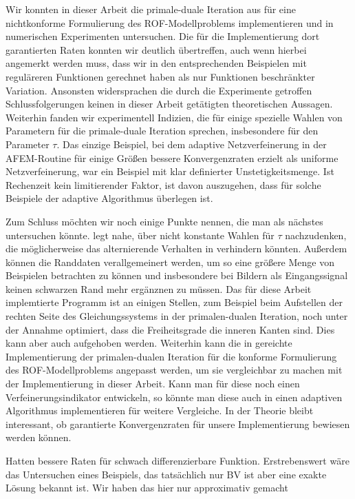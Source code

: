Wir konnten in dieser Arbeit die primale-duale Iteration aus
\cite{Bar15} für eine nichtkonforme Formulierung des ROF-Modellproblems
implementieren und in numerischen Experimenten untersuchen. 
Die für die Implementierung dort garantierten Raten konnten wir deutlich 
übertreffen, auch wenn hierbei angemerkt werden muss, dass wir in den
entsprechenden Beispielen mit reguläreren Funktionen gerechnet haben
als nur Funktionen beschränkter Variation.
Ansonsten widersprachen die durch die Experimente getroffen Schlussfolgerungen
keinen in dieser Arbeit getätigten theoretischen Aussagen.
Weiterhin fanden wir experimentell Indizien, die für einige spezielle Wahlen
von Parametern für die primale-duale Iteration sprechen, insbesondere
für den Parameter $\tau$.
Das einzige Beispiel, bei dem adaptive Netzverfeinerung in der 
AFEM-Routine für einige Größen bessere Konvergenzraten erzielt als uniforme
Netzverfeinerung, war ein Beispiel mit klar definierter Unstetigkeitsmenge.
Ist Rechenzeit kein limitierender Faktor, ist davon auszugehen, dass für
solche Beispiele der adaptive Algorithmus überlegen ist.

Zum Schluss möchten wir noch einige Punkte nennen, die man als nächstes
untersuchen könnte.
 legt nahe, über nicht konstante Wahlen für
$\tau$ nachzu\-denken, die mög\-lich\-er\-wei\-se das alternierende Verhalten in
 verhindern könnten.
Außerdem können die Randdaten verallgemeinert werden, um so eine größere
Menge von Beispielen betrachten zu können und insbesondere bei Bildern
als Eingangssignal keinen schwarzen Rand mehr ergänznen zu müssen. 
Das für diese Arbeit implemtierte Programm ist an einigen Stellen, zum Beispiel
beim Aufstellen der rechten Seite des Gleichungssystems in der primalen-dualen
Iteration, noch unter der Annahme optimiert, dass die Freiheitsgrade die inneren
Kanten sind.  
Dies kann aber auch aufgehoben werden.
Weiterhin kann die in \cite{Bar15} gereichte Implementierung der primalen-dualen
Iteration für die konforme Formulierung des ROF-Modellproblems angepasst werden,
um sie vergleichbar zu machen mit der Implementierung in dieser Arbeit. 
Kann man für diese noch einen Verfeinerungsindikator entwickeln, so könnte man
diese auch in einen adaptiven Algorithmus implementieren für weitere Vergleiche.
In der Theorie bleibt interessant, ob garantierte Konvergenzraten für unsere
Implementierung bewiesen werden können.

Hatten bessere Raten für schwach differenzierbare Funktion. Erstrebenswert
wäre das Untersuchen eines Beispiels, das tatsächlich nur BV ist aber
eine exakte Lösung bekannt ist. Wir haben das hier nur approximativ gemacht

